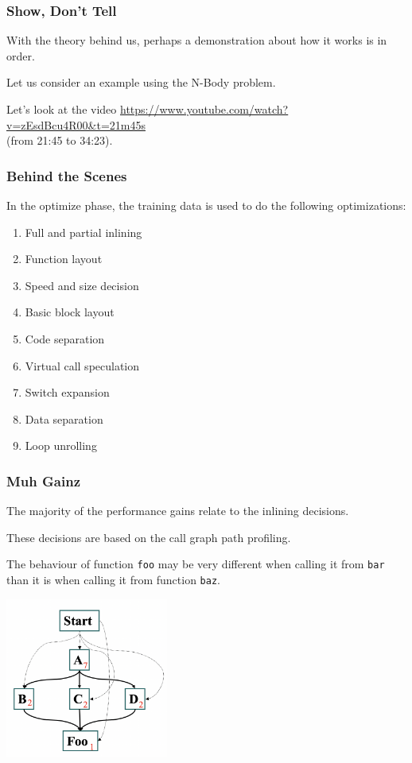 \begin{frame}
\frametitle{Show, Don't Tell}

With the theory behind us, perhaps a demonstration about how it works is in order. 

Let us consider an example using the N-Body problem. 

Let's look at the video \url{https://www.youtube.com/watch?v=zEsdBcu4R00&t=21m45s}\\ (from 21:45 to 34:23).

\end{frame}



\begin{frame}
\frametitle{Behind the Scenes}

In the optimize phase, the training data is used to do the following optimizations:

\begin{enumerate}
\item Full and partial inlining
\item Function layout
\item Speed and size decision
\item Basic block layout 
\item Code separation
\item Virtual call speculation
\item Switch expansion
\item Data separation
\item Loop unrolling
\end{enumerate}

\end{frame}



\begin{frame}
\frametitle{Muh Gainz}

The majority of the performance gains relate to the inlining decisions. 

These decisions are based on the call graph path profiling. 

The behaviour of function \texttt{foo} may be very different when calling it from \texttt{bar} than it is when calling it from function \texttt{baz}. 


\begin{center}
	\includegraphics[width=0.4\textwidth]{images/callpaths.png}
\end{center}

\end{frame}



